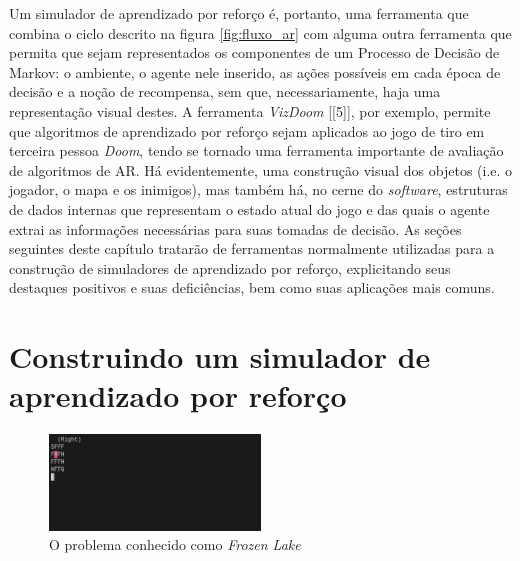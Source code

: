 \documentclass[cic,tc]{iiufrgs}
\begin{document}
Um simulador de aprendizado por reforço é, portanto, uma ferramenta que combina
o ciclo descrito na figura \ref{fig:fluxo_ar} com alguma outra ferramenta que
permita que sejam representados os componentes de um Processo de Decisão de
Markov: o ambiente, o agente nele inserido, as ações possíveis em cada época de
decisão e a noção de recompensa, sem que, necessariamente, haja uma
representação visual destes. A ferramenta \textit{VizDoom} [[5]], por exemplo,
permite que algoritmos de aprendizado por reforço sejam aplicados ao jogo de
tiro em terceira pessoa \textit{Doom}, tendo se tornado uma ferramenta
importante de avaliação de algoritmos de AR. Há evidentemente, uma construção
visual dos objetos (i.e. o jogador, o mapa e os inimigos), mas também há, no
cerne do \textit{software}, estruturas de dados internas que representam o
estado atual do jogo e das quais o agente extrai as informações necessárias para
suas tomadas de decisão. As seções seguintes deste capítulo tratarão de
ferramentas normalmente utilizadas para a construção de simuladores de
aprendizado por reforço, explicitando seus destaques positivos e suas
deficiências, bem como suas aplicações mais comuns.


\section{Construindo um simulador de aprendizado por reforço}


\begin{figure}[h]
    \caption{O problema conhecido como \textit{Frozen Lake}}
    \begin{center}
      \includegraphics[width=0.5\textwidth]{frozen_lake.png}
    \end{center}
    \label{fig:frozen_lake}
\end{figure}
\end{document}
